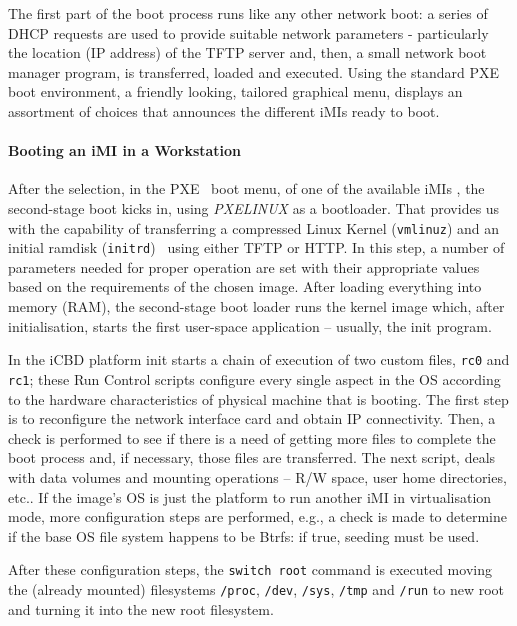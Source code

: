 The first part of the boot process runs like any other network boot: a series of DHCP requests are used to provide suitable network parameters - particularly the location (IP address) of the TFTP server and, then, a small network boot manager program, is transferred, loaded and executed. Using the standard PXE boot environment, a friendly looking, tailored graphical menu, displays an assortment of choices that announces the different iMIs ready to boot.

\paragraph{Booting an iMI in a Workstation}
\label{subsub:icbd_booting_imi}

After the selection, in the PXE~\cite{ibm_linux_boot} boot menu, of one of the available iMIs , the second-stage boot kicks in, using \textit{PXELINUX} as a bootloader. That provides us with the capability of transferring a compressed Linux Kernel (\texttt{vmlinuz}) and an initial ramdisk (\texttt{initrd})~\cite{ibm_initrd} using either TFTP or HTTP. In this step, a number of parameters needed for proper operation are set with their appropriate values based on the requirements of the chosen image. After loading everything into memory (RAM), the second-stage boot loader runs the kernel image which, after initialisation, starts the first user-space application – usually, the init program.

In the iCBD platform init starts a chain of execution of two custom files, \texttt{rc0} and \texttt{rc1}; these Run Control scripts configure every single aspect in the OS according to the hardware characteristics of physical machine that is booting. The first step is to reconfigure the network interface card and obtain IP connectivity. Then, a check is performed to see if there is a need of getting more files to complete the boot process and, if necessary, those files are transferred. The next script, deals with data volumes and mounting operations – R/W space, user home directories, etc.. If the image’s OS is just the platform to run another iMI in virtualisation mode, more configuration steps are performed, e.g., a check is made to determine if the base OS file system happens to be Btrfs: if true, seeding must be used.

After these configuration steps, the \texttt{switch root} command is executed moving the (already mounted) filesystems \texttt{/proc}, \texttt{/dev}, \texttt{/sys}, \texttt{/tmp} and \texttt{/run} to new root and turning it into the new root filesystem.


